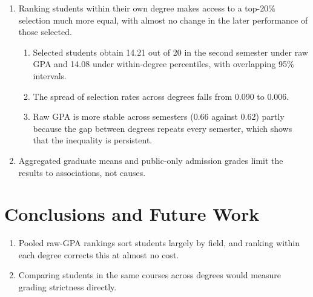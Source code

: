 \documentclass[clean]{bam-outline}
\begin{document}
\begin{enumerate}[resume]
  \begin{enumerate}
  \item In the median university-year, 41\% of Nursing graduates reach the top 20\%, compared with 6\% of Business Administration graduates (interquartile ranges 29--54\% and 2--13\%).
  \item Truncating the normal distribution between 5 and 10 changes selection shares by an average absolute difference of 0.04 percentage points, weighted by graduate counts, without changing the overall field ranking.
  \end{enumerate}
\item Ranking students within their own degree makes access to a top-20\% selection much more equal, with almost no change in the later performance of those selected.
  \begin{enumerate}
  \item Selected students obtain 14.21 out of 20 in the second semester under raw GPA and 14.08 under within-degree percentiles, with overlapping 95\% intervals.
  \item The spread of selection rates across degrees falls from 0.090 to 0.006.
  \item Raw GPA is more stable across semesters (0.66 against 0.62) partly because the gap between degrees repeats every semester, which shows that the inequality is persistent.
  \end{enumerate}
\item Aggregated graduate means and public-only admission grades limit the results to associations, not causes.
\end{enumerate}

\section{Conclusions and Future Work}
\begin{enumerate}[resume]
\item Pooled raw-GPA rankings sort students largely by field, and ranking within each degree corrects this at almost no cost.
\item Comparing students in the same courses across degrees would measure grading strictness directly.
\end{enumerate}

\end{document}
